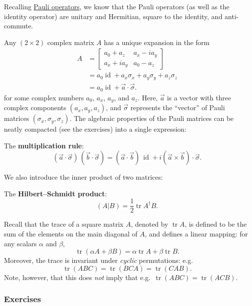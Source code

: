 \documentclass{article}
\begin{document}
Recalling \protect\hyperlink{pauli-operators}{Pauli operators}, we know that the Pauli operators (as well as the identity operator) are unitary and Hermitian, square to the identity, and anti-commute.

Any \((2\times 2)\) complex matrix \(A\) has a unique expansion in the form
\begin{equation}
  \begin{aligned}
    A &=
    \begin{bmatrix}
      a_0 + a_z & a_x - i a_y
    \\a_x +i a_y &  a_0 - a_z
    \end{bmatrix}
  \\&= a_0\operatorname{id}+ a_x \sigma_x + a_y \sigma_y + a_z \sigma_z
  \\&= a_0\operatorname{id}+ \vec{a}\cdot\vec{\sigma}.
  \end{aligned}
\label{eq:pauli}
\end{equation}
for some complex numbers \(a_0\), \(a_x\), \(a_y\), and \(a_z\).
Here, \(\vec{a}\) is a vector with three complex components \((a_x, a_y, a_z)\), and \(\vec{\sigma}\) represents the ``vector'' of Pauli matrices \((\sigma_x,\sigma_y,\sigma_z)\).
The algebraic properties of the Pauli matrices can be neatly compacted (see the exercises) into a single expression:

The \textbf{multiplication rule}:
\[
    (\vec{a}\cdot\vec{\sigma})\,(\vec{b}\cdot\vec{\sigma})
    = (\vec{a}\cdot\vec{b})\,\operatorname{id}+ i(\vec{a}\times \vec{b})\cdot\vec{\sigma}.
  \]

We also introduce the inner product of two matrices:

The \textbf{Hilbert--Schmidt product}:
\[
    (A|B) = \frac12 \operatorname{tr}A^\dagger B.
  \]

Recall that the trace of a square matrix \(A\), denoted by \(\operatorname{tr}A\), is defined to be the sum of the elements on the main diagonal of \(A\), and defines a linear mapping: for any scalars \(\alpha\) and \(\beta\),
\[
  \operatorname{tr}(\alpha A+\beta B) = \alpha\operatorname{tr}A +\beta\operatorname{tr}B.
\]
Moreover, the trace is invariant under \emph{cyclic} permutations: e.g.
\[
  \operatorname{tr}(ABC) = \operatorname{tr}(BCA) = \operatorname{tr}(CAB).
\]
Note, however, that this does \emph{not} imply that e.g.~\(\operatorname{tr}(ABC)=\operatorname{tr}(ACB)\).

\hypertarget{exercises-1}{%
\subsubsection{Exercises}\label{exercises-1}}
\end{document}
